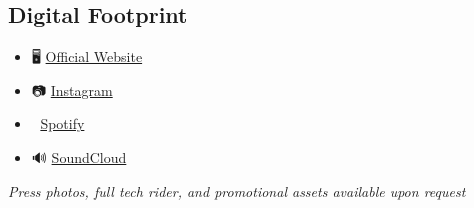\documentclass{article}
\begin{document}
\subsection*{Digital Footprint}  
\begin{itemize}  
\item 🖥️ \href{https://vozzrich.com}{Official Website}  
\item 📷 \href{https://instagram.com/vozzrich}{Instagram}  
\item 🎵 \href{https://open.spotify.com/artist/27sSKrytmUXukDnMGPXNHQ}{Spotify}  
\item 🔊 \href{https://soundcloud.com/vozzrich}{SoundCloud}  
\end{itemize}  

{\centering\small\itshape Press photos, full tech rider, and promotional assets available upon request\par}  
\end{document}
